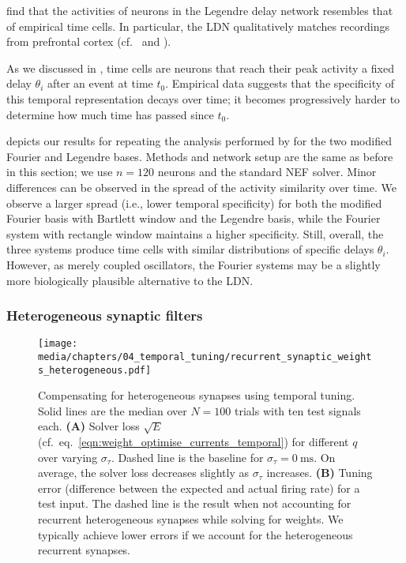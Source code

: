  find that the activities of neurons in the Legendre delay network resembles that of empirical time cells.
In particular, the LDN qualitatively matches recordings from prefrontal cortex (cf.~\cite{tiganj2016sequential} and ).

As we discussed in , time cells are neurons that reach their peak activity a fixed delay $\theta_i$ after an event at time $t_0$.
Empirical data suggests \citep[e.g.][]{macdonald2011hippocampal,tiganj2016sequential} that the specificity of this temporal representation decays over time; it becomes progressively harder to determine how much time has passed since $t_0$.

 depicts our results for repeating the analysis performed by  for the two modified Fourier and Legendre bases.
Methods and network setup are the same as before in this section; we use $n = 120$ neurons and the standard NEF solver.
Minor differences can be observed in the spread of the activity similarity over time.
We observe a larger spread (i.e., lower temporal specificity) for both the modified Fourier basis with Bartlett window and the Legendre basis, while the Fourier system with rectangle window maintains a higher specificity.
Still, overall, the three systems produce time cells with similar distributions of specific delays $\theta_i$.
However, as merely coupled oscillators, the Fourier systems may be a slightly more biologically plausible alternative to the LDN.

\subsubsection{Heterogeneous synaptic filters}

\begin{figure}
	\centering
	\texttt{[image: media/chapters/04\_temporal\_tuning/recurrent\_synaptic\_weights\_heterogeneous.pdf]}
	\caption[Compensating for heterogeneous synapses using temporal tuning]{Compensating for heterogeneous synapses using temporal tuning.
	Solid lines are the median over $N = 100$ trials with ten test signals each.
	\textbf{(A)} Solver loss $\sqrt{E}$ (cf.~eq.~\ref{eqn:weight_optimise_currents_temporal}) for different $q$ over varying $\sigma_\tau$.
	Dashed line is the baseline for $\sigma_\tau = \SI{0}{\milli\second}$.
	On average, the solver loss decreases slightly as $\sigma_\tau$ increases.
	\textbf{(B)} Tuning error (difference between the expected and actual firing rate) for a test input.
	The dashed line is the result when not accounting for recurrent heterogeneous synapses while solving for weights.
	We typically achieve lower errors if we account for the heterogeneous recurrent synapses.
	}
	\label{fig:recurrent_synaptic_weights_heterogeneous}
\end{figure}


